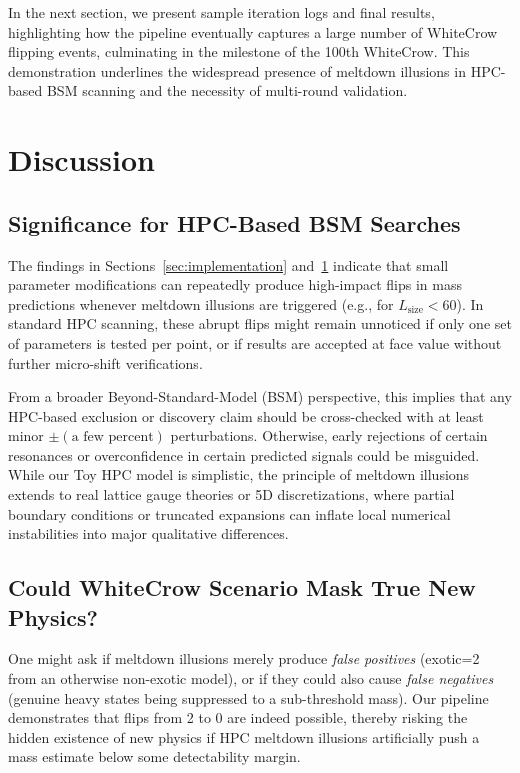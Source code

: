 \documentclass[11pt]{article}
\begin{document}
In the next section, we present sample iteration logs and final results,
highlighting how the pipeline eventually captures a large number
of WhiteCrow flipping events, culminating in the milestone
of the 100th WhiteCrow. This demonstration underlines
the widespread presence of meltdown illusions in HPC-based BSM scanning
and the necessity of multi-round validation.

\section{Discussion}
\label{sec:discussion}

\subsection{Significance for HPC-Based BSM Searches}

The findings in Sections~\ref{sec:implementation} and~\ref{sec:discussion} indicate that small parameter modifications can repeatedly produce high-impact flips in mass predictions whenever meltdown illusions
are triggered (e.g., for $L_{\mathrm{size}} < 60$). In standard HPC scanning,
these abrupt flips might remain unnoticed if only one set of parameters
is tested per point, or if results are accepted at face value
without further micro-shift verifications.

From a broader Beyond-Standard-Model (BSM) perspective,
this implies that any HPC-based exclusion or discovery claim
should be cross-checked with at least minor $\pm (\text{a few percent})$
perturbations. Otherwise, early rejections of certain resonances
or overconfidence in certain predicted signals could be misguided.
While our Toy HPC model is simplistic,
the principle of meltdown illusions extends to
real lattice gauge theories or 5D discretizations,
where partial boundary conditions or truncated expansions
can inflate local numerical instabilities
into major qualitative differences.

\subsection{Could WhiteCrow Scenario Mask True New Physics?}

One might ask if meltdown illusions merely produce
\textit{false positives} (exotic=2 from an otherwise non-exotic model),
or if they could also cause \textit{false negatives} (genuine heavy states
being suppressed to a sub-threshold mass). Our pipeline demonstrates
that flips from 2 to 0 are indeed possible, thereby risking
the hidden existence of new physics if HPC meltdown illusions artificially
push a mass estimate below some detectability margin.
\end{document}
